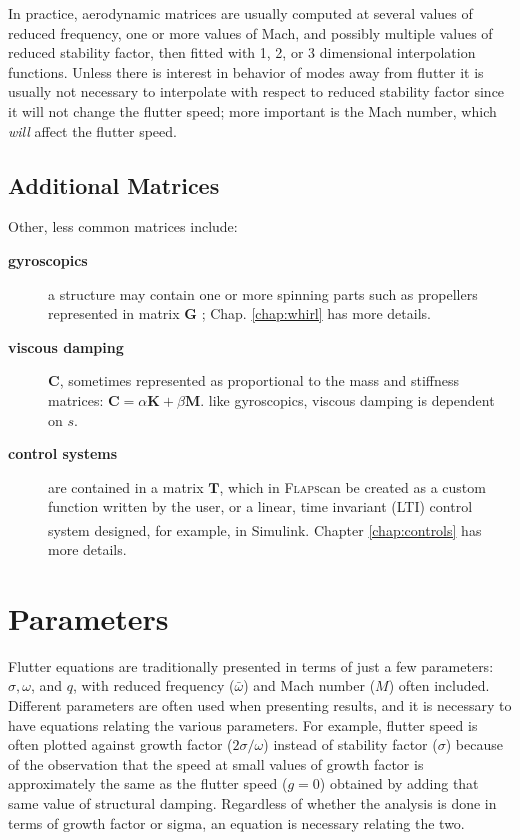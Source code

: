 \documentclass[10pt,openany,twoside]{book}
\numberwithin{equation}{section}   %
\newcommand{\Matrix}[1]{\boldsymbol{#1}}
\newcommand{\Flaps}{{\normalfont\scshape Flaps\:}}
\newcommand{\Simulink}{{\footnotesize{Simulink\textsuperscript{\textregistered}}\:}}
\newcommand{\Chapref}[1]{Chap. \ref{#1}}
\begin{document}
In practice, aerodynamic matrices are usually computed at several values
of reduced frequency, one or more values of Mach, and possibly
multiple values of reduced stability factor, then fitted with
1, 2, or 3 dimensional interpolation functions.
Unless there is interest in behavior of modes away from flutter
it is usually not necessary to interpolate with respect to reduced
stability factor since it will not change the flutter speed;
more important is the Mach number, which \emph{will} affect the flutter speed.

\subsection{Additional Matrices}
Other, less common matrices include:

\begin{description}
	\item[\bf gyroscopics] a structure may contain one or more spinning
	parts such as propellers represented in matrix $\Matrix{G}$
	; \Chapref{chap:whirl} has more details.

	\item[\bf viscous damping] $\Matrix{C}$, sometimes represented as
		proportional to the mass and stiffness matrices:
			\mbox{$\Matrix{C} = \alpha\Matrix{K} + \beta\Matrix{M}$}.
		like gyroscopics, viscous damping is dependent on $s$.

	\item[\bf control systems] are contained in a matrix $\Matrix{T}$,
		which in \Flaps can be created as a custom function written by the user,
		or a linear, time invariant (LTI) control system designed, for
		example, in \Simulink. Chapter \ref{chap:controls} has more details.
\end{description}

\section{Parameters}
Flutter equations are traditionally presented in terms of just a few
parameters: $\sigma, \omega$, and $q$, with reduced frequency ($\bar\omega$)
and Mach number ($M$) often included.
Different parameters are often used when presenting results, and it
is necessary to have equations relating the various parameters.
For example, flutter speed is often plotted against growth factor
($2\sigma/\omega$) instead of stability factor ($\sigma$)
because of the observation that the speed at small values of
growth factor is approximately the same as the flutter speed ($g=0$)
obtained by adding that same value of structural damping.
Regardless of whether the analysis is done in terms of growth factor
or sigma, an equation is necessary relating the two.
\end{document}
